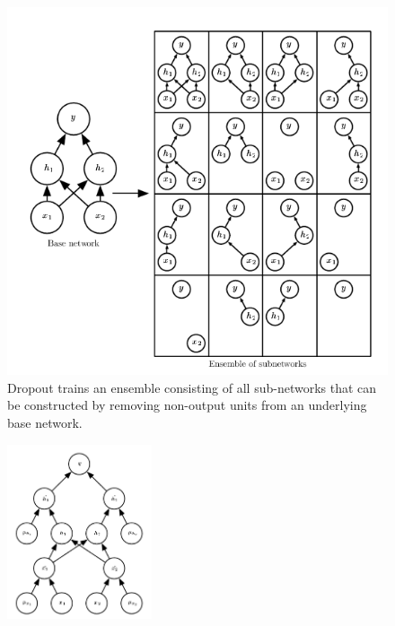 \documentclass{article}
\begin{document}
		\newpage
		\begin{figure}
			\includegraphics[width=\linewidth]{figures/dropout}
			\caption{Dropout trains an ensemble consisting of all sub-networks that can be
				constructed by removing non-output units from an underlying base network.}
			\label{fig:dropout}
		\end{figure}

		\begin{figure}
			\vspace{-20pt}
			\begin{center}
				\includegraphics[width=0.38\textwidth]{figures/dropoutexample}\label{dropoutexample}
			\end{center}
			\vspace{-20pt}
			\vspace{-10pt}
		\end{figure}
		
\end{document}
